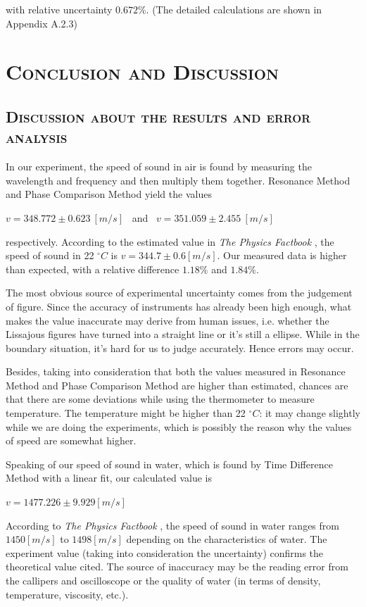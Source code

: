 \documentclass[a4paper,12pt]{article}
\begin{document}
with relative uncertainty $ 0.672\% $. (The detailed calculations are shown in Appendix A.2.3)


\section{\textsc{Conclusion and Discussion}}
\subsection{\textsc{Discussion about the results and error analysis}}
In our experiment, the speed of sound in air is found by measuring the wavelength and frequency and then multiply them together. Resonance Method and Phase Comparison Method yield the values
\begin{center}
$v = 348.772 \pm 0.623~[m/s]$ ~and~ $v = 351.059 \pm 2.455~[m/s]$
\end{center}
respectively. According to the estimated value in \textit{The Physics Factbook} \cite{ct1}, the speed of sound in 22 $^{\circ}C$ is $v = 344.7 \pm 0.6 [m/s]$. Our measured data is higher than expected, with a relative difference $1.18\%$ and $1.84\%$. \par
The most obvious source of experimental uncertainty comes from the judgement of figure. Since the accuracy of instruments has already been high enough, what makes the value inaccurate may derive from human issues, i.e. whether the Lissajous figures have turned into a straight line or it's still a ellipse. While in the boundary situation, it's hard for us to judge accurately. Hence errors may occur. \par 
Besides, taking into consideration that both the values measured in Resonance Method and Phase Comparison Method are higher than estimated, chances are that there are some deviations while using the thermometer to measure temperature. The temperature might be higher than 22 $^{\circ}C$: it may change slightly while we are doing the experiments, which is possibly the reason why the values of speed are somewhat higher.\\
 \par
Speaking of our speed of sound in water, which is found by Time Difference Method with a linear fit, our calculated value is 
\begin{center}
$v = 1477.226 \pm 9.929 [m/s]$
\end{center}
According to \textit{The Physics Factbook} \cite{ct1}, the speed of sound in water ranges from $1450 [m/s]$ to $1498 [m/s]$ depending on the characteristics of water. The experiment value (taking into consideration the uncertainty) confirms the theoretical value cited. The source of inaccuracy may be the reading error from the callipers and oscilloscope or the quality of water (in terms of density, temperature, viscosity, etc.). 
\end{document}
